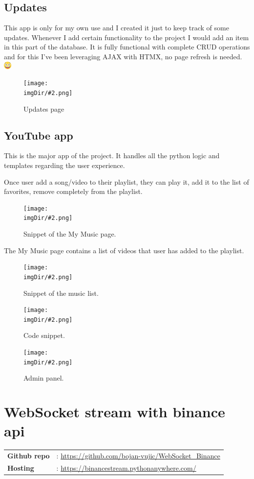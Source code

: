 \documentclass[11pt, onecolumn]{article}
\newcommand{\demo}[2]{%
	\vspace{3mm}
	\begin{tabular}{ll}
		\textbf{Github repo} & : \color{blue}#1\vspace{1mm}\\
		\vspace{2mm}\textbf{Hosting} & : \color{blue}#2 \\
	\end{tabular}
	\vspace{3mm}
}
\newcommand{\fig}[3]{%
	\vspace{-2mm}
	\begin{figure}[H]
		\centering
		\texttt{[image: \\imgDir/\#2.png]}
		\vspace{-3mm}
		\caption[]{#3}
		\label{fig:#2}
	\end{figure}
	\vspace{-2mm}
}
\def\smiley{\includegraphics[width=4mm]{743267}}
\begin{document}
\begin{multicols}{2}
\subsection*{Updates}

This app is only for my own use and I created it just to keep track of some updates. Whenever I add certain functionality to the project I would add an item in this part of the database. It is fully functional with complete CRUD operations and for this I've been leveraging AJAX with HTMX, no page refresh is needed. \smiley

\fig{70mm}{img-6}{Updates page}

\subsection*{YouTube app}

This is the major app of the project. It handles all the python logic and templates regarding the user experience.

Once user add a song/video to their playlist, they can play it, add it to the list of favorites, remove completely from the playlist.

\fig{80mm}{img-7}{Snippet of the My Music page.}

The My Music page contains a list of videos that user has added to the playlist.

\fig{80mm}{img-8}{Snippet of the music list.}

\fig{80mm}{img-9}{Code snippet.}

\fig{80mm}{img-10}{Admin panel.}

\end{multicols}


\pagebreak
\section{WebSocket stream with binance api}
\def\imgDir{websockets}
\demo{\url{https://github.com/bojan-vujic/WebSocket_Binance}}{\url{https://binancestream.pythonanywhere.com/}}
\end{document}
